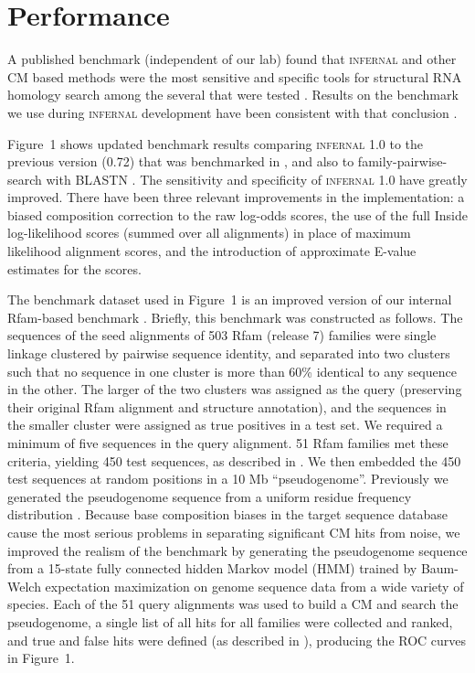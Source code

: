 
\section{Performance}

A published benchmark (independent of our lab) found that
\textsc{infernal} and other CM based methods were the most sensitive
and specific tools for structural RNA homology search among the
several that were tested \citep{Freyhult07}.  Results on the benchmark
we use during \textsc{infernal} development have been consistent with
that conclusion \citep{NawrockiEddy07}. 

Figure~1 shows updated benchmark results comparing \textsc{infernal}
1.0 to the previous version (0.72) that was benchmarked in
\citep{Freyhult07}, and also to family-pairwise-search with BLASTN
\citep{Altschul97,Grundy98b}.  The sensitivity and specificity of
\textsc{infernal} 1.0 have greatly improved. There have been three
relevant improvements in the implementation: a biased composition
correction to the raw log-odds scores, the use of the full Inside
log-likelihood scores (summed over all alignments) in place of maximum
likelihood alignment scores, and the introduction of approximate
E-value estimates for the scores.

The benchmark dataset used in Figure~1 is an improved version of our
internal Rfam-based benchmark \citep{NawrockiEddy07}. Briefly, this
benchmark was constructed as follows. The sequences of the seed
alignments of 503 Rfam (release 7) families were single linkage
clustered by pairwise sequence identity, and separated into two
clusters such that no sequence in one cluster is more than 60\%
identical to any sequence in the other. The larger of the two clusters
was assigned as the query (preserving their original Rfam alignment
and structure annotation), and the sequences in the smaller cluster
were assigned as true positives in a test set. We required a minimum
of five sequences in the query alignment. 51 Rfam families met these
criteria, yielding 450 test sequences, as described in
\citep{NawrockiEddy07}. We then embedded the 450 test sequences at
random positions in a 10 Mb ``pseudogenome''. Previously we generated
the pseudogenome sequence from a uniform residue frequency
distribution \citep{NawrockiEddy07}. Because base composition biases
in the target sequence database cause the most serious problems in
separating significant CM hits from noise, we improved the realism of
the benchmark by generating the pseudogenome sequence from a 15-state
fully connected hidden Markov model (HMM) trained by Baum-Welch
expectation maximization \citep{Durbin98} on genome sequence data from
a wide variety of species. Each of the 51 query alignments was used to
build a CM and search the pseudogenome, a single list of all hits for
all families were collected and ranked, and true and false hits were
defined (as described in \citep{NawrockiEddy07}), producing the ROC
curves in Figure~1.

